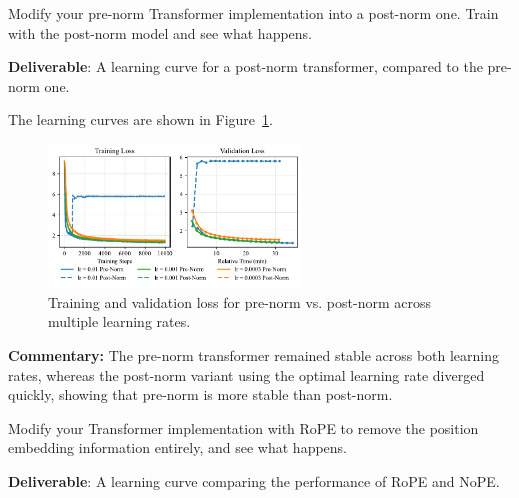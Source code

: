 
Modify your pre-norm Transformer implementation into a post-norm one. Train with the post-norm model and see what happens.

\textbf{Deliverable}: A learning curve for a post-norm transformer, compared to the pre-norm one.

\begin{answer}

The learning curves are shown in Figure~\ref{fig:prenorm_ablation}.

\begin{figure}[!htb]
    \centering
    \includegraphics[width=0.6\textwidth]{images/prenorm_ablation_experiments.pdf}
    \caption{Training and validation loss for pre-norm vs. post-norm across multiple learning rates.}
    \label{fig:prenorm_ablation}
\end{figure}

\textbf{Commentary:} The pre-norm transformer remained stable across both learning rates, whereas the post-norm variant using the optimal learning rate diverged quickly, showing that pre-norm is more stable than post-norm.
\end{answer}


Modify your Transformer implementation with RoPE to remove the position embedding information entirely, and see what happens.

\textbf{Deliverable}: A learning curve comparing the performance of RoPE and NoPE.

